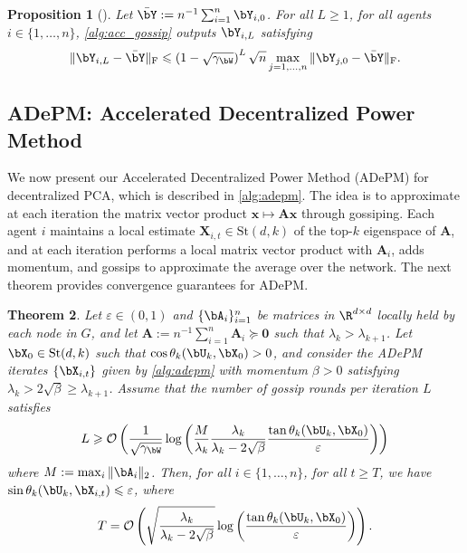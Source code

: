 \documentclass{article}
\theoremstyle{plain}
\newtheorem{theorem}{Theorem}[section]
\newtheorem{proposition}[theorem]{Proposition}
\theoremstyle{definition}
\theoremstyle{remark}
\begin{document}
\begin{proposition}[\citet{ye21}]\label{prop:accgossip}
  Let $\bar{\bY} := n^{-1} \sum_{i=1}^n \bY_{i,0}$. For all $L \geqslant 1$, for all agents $i \in \{1,\dots,n\}$, \cref{alg:acc_gossip} outputs $\bY_{i,L}$ satisfying
  \begin{align*}
    \Vert \bY_{i,L} - \bar{\bY} \Vert_\mathrm{F} \leqslant \left(1 - \sqrt{\gamma_\bW}\right)^L \sqrt{n} \max_{j=1,\dots,n} \Vert \bY_{j,0} - \bar{\bY} \Vert_\mathrm{F}.
  \end{align*}
\end{proposition}


\subsection{ADePM: Accelerated Decentralized Power Method}



We now present our Accelerated Decentralized Power Method (ADePM) for decentralized PCA, which is described in \cref{alg:adepm}. The idea is to approximate at each iteration the matrix vector product $\bm{x} \mapsto \mathbf{A}\bm{x}$ through gossiping. Each agent $i$ maintains a local estimate $\mathbf{X}_{i,t} \in \mathrm{St}(d,k)$ of the top-$k$ eigenspace of $\mathbf{A}$, and at each iteration performs a local matrix vector product with $\mathbf{A}_i$, adds momentum, and gossips to approximate the average over the network. The next theorem provides convergence guarantees for ADePM.



\begin{theorem}\label{th:adepm}
    Let $\varepsilon \in (0,1)$ and $\{\bA_i\}_{i=1}^n$ be matrices in $\R^{d\times d}$ locally held by each node in $G$, and let $\mathbf{A} := n^{-1} \sum_{i=1}^n \mathbf{A}_i \succeq \mathbf{0}$ such that $\lambda_k > \lambda_{k+1}$. Let $\bX_0 \in \mathrm{St}(d,k)$ such that $\cos\theta_k(\bU_k, \bX_0) > 0$, and consider the ADePM iterates $\{\bX_{i,t}\}$ given by \cref{alg:adepm} with momentum $\beta > 0$ satisfying $\lambda_k > 2\sqrt{\beta} \geqslant \lambda_{k+1}$. Assume that the number of gossip rounds per iteration $L$ satisfies
    \begin{align*}
      L \geqslant \mathcal{O}\left(\frac{1}{\sqrt{\gamma_\bW}} \log\left( \frac{M}{\lambda_k}\frac{\lambda_k}{\lambda_k-2\sqrt{\beta}}\frac{\tan\theta_k(\bU_k,\bX_0)}{\varepsilon}\right)\right)
    \end{align*}
    where $M := \max_{i} \Vert \bA_i \Vert_2$. Then, for all $i \in \{1,\dots,n\}$, for all $t\geqslant T$, we have $\sin\theta_k(\bU_k, \bX_{i,t}) \leqslant \varepsilon$, where
    \begin{align*}
      T = \mathcal{O}\left(\sqrt{\frac{\lambda_k}{\lambda_k - 2\sqrt{\beta}}} \log\left(\frac{\tan\theta_k(\bU_k, \bX_0)}{\varepsilon}\right)\right).
    \end{align*}
\end{theorem}
\end{document}
